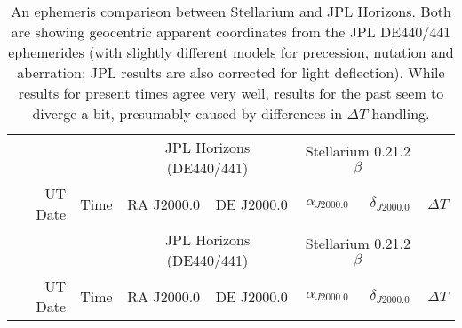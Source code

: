 
\begin{longtable}{r@{\,}r|r@{h\,}r@{m\,}r<{s}|r@{°\,}r@{'\,}r<{''}||r@{h\,}r@{m\,}r<{s}|r@{°\,}r@{'\,}r<{''}r<{s}}

\caption{An ephemeris comparison between Stellarium and JPL
  Horizons. Both are showing geocentric apparent
  coordinates from the JPL DE440/441 ephemerides 
  (with slightly different models for precession, nutation
  and aberration; JPL results are also corrected for light
  deflection). While results for present times agree very well,
  results for the past seem to diverge a bit, presumably caused by
  differences in $\Delta T$ handling.}
\label{tab:accuracy:UT}\\
\multicolumn{2}{c}{}&\multicolumn{6}{c||}{JPL Horizons (DE440/441)} & \multicolumn{6}{c}{Stellarium 0.21.2$\beta$}\\ 
UT Date   & Time   & \multicolumn{3}{c}{RA J2000.0} & \multicolumn{3}{c||}{DE J2000.0} & \multicolumn{3}{c}{$\alpha_{J2000.0}$} & \multicolumn{3}{c}{$\delta_{J2000.0}$} & \multicolumn{1}{c}{$\Delta T$}\\
\midrule
\endfirsthead
  
\multicolumn{2}{c}{}&\multicolumn{6}{c||}{JPL Horizons (DE440/441)} & \multicolumn{6}{c}{Stellarium 0.21.2$\beta$}\\ 
UT Date   & Time   & \multicolumn{3}{c}{RA J2000.0} & \multicolumn{3}{c||}{DE J2000.0} & \multicolumn{3}{c}{$\alpha_{J2000.0}$} & \multicolumn{3}{c}{$\delta_{J2000.0}$} & \multicolumn{1}{c}{$\Delta T$}\\
\midrule\endhead
  

\end{longtable}
